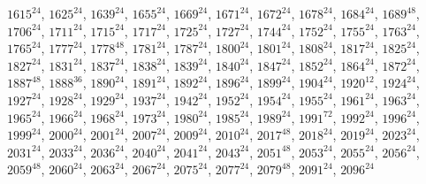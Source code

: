 \begin{itemize}
$1615^{24}$, $1625^{24}$, $1639^{24}$, $1655^{24}$, $1669^{24}$, $1671^{24}$, $1672^{24}$, $1678^{24}$, $1684^{24}$, $1689^{48}$, $1706^{24}$, $1711^{24}$, $1715^{24}$, $1717^{24}$, $1725^{24}$, $1727^{24}$, $1744^{24}$, $1752^{24}$, $1755^{24}$, $1763^{24}$, $1765^{24}$, $1777^{24}$, $1778^{48}$, $1781^{24}$, $1787^{24}$, $1800^{24}$, $1801^{24}$, $1808^{24}$, $1817^{24}$, $1825^{24}$, $1827^{24}$, $1831^{24}$, $1837^{24}$, $1838^{24}$, $1839^{24}$, $1840^{24}$, $1847^{24}$, $1852^{24}$, $1864^{24}$, $1872^{24}$, $1887^{48}$, $1888^{36}$, $1890^{24}$, $1891^{24}$, $1892^{24}$, $1896^{24}$, $1899^{24}$, $1904^{24}$, $1920^{12}$, $1924^{24}$, $1927^{24}$, $1928^{24}$, $1929^{24}$, $1937^{24}$, $1942^{24}$, $1952^{24}$, $1954^{24}$, $1955^{24}$, $1961^{24}$, $1963^{24}$, $1965^{24}$, $1966^{24}$, $1968^{24}$, $1973^{24}$, $1980^{24}$, $1985^{24}$, $1989^{24}$, $1991^{72}$, $1992^{24}$, $1996^{24}$, $1999^{24}$, $2000^{24}$, $2001^{24}$, $2007^{24}$, $2009^{24}$, $2010^{24}$, $2017^{48}$, $2018^{24}$, $2019^{24}$, $2023^{24}$, $2031^{24}$, $2033^{24}$, $2036^{24}$, $2040^{24}$, $2041^{24}$, $2043^{24}$, $2051^{48}$, $2053^{24}$, $2055^{24}$, $2056^{24}$, $2059^{48}$, $2060^{24}$, $2063^{24}$, $2067^{24}$, $2075^{24}$, $2077^{24}$, $2079^{48}$, $2091^{24}$, $2096^{24}$

\end{itemize}

